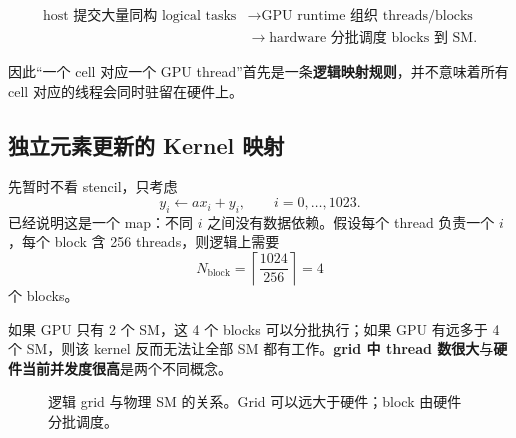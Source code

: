 \begin{equation}
\boxed{
\begin{aligned}
\text{host 提交大量同构 logical tasks}
&\rightarrow
\text{GPU runtime 组织 threads/blocks}\\
&\rightarrow
\text{hardware 分批调度 blocks 到 SM}.
\end{aligned}}
\label{eq:gpu-submission-model}
\end{equation}

因此“一个 cell 对应一个 GPU thread”首先是一条\textbf{逻辑映射规则}，并不意味着所有 cell 对应的线程会同时驻留在硬件上。

\subsection{独立元素更新的 Kernel 映射}

先暂时不看 stencil，只考虑
\begin{equation}
y_i\leftarrow a x_i+y_i,
\qquad i=0,\ldots,1023.
\label{eq:gpu-axpy-micro}
\end{equation}
已经说明这是一个 map：不同 $i$ 之间没有数据依赖。假设每个 thread 负责一个 $i$，每个 block 含 256 threads，则逻辑上需要
\begin{equation}
N_{\mathrm{block}}=\left\lceil\frac{1024}{256}\right\rceil=4
\end{equation}
个 blocks。

如果 GPU 只有 2 个 SM，这 4 个 blocks 可以分批执行；如果 GPU 有远多于 4 个 SM，则该 kernel 反而无法让全部 SM 都有工作。\textbf{grid 中 thread 数很大}与\textbf{硬件当前并发度很高}是两个不同概念。

\begin{figure}[htbp]
\centering
{}
\caption{逻辑 grid 与物理 SM 的关系。Grid 可以远大于硬件；block 由硬件分批调度。}
\label{fig:gpu-grid-sm-model}
\end{figure}

